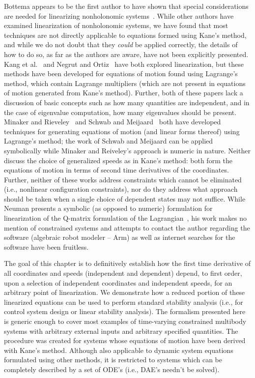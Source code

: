 Bottema appears to be the first author to have shown that special
considerations are needed for linearizing nonholonomic
systems~\cite{Bottema1949}. While other authors have examined linearization of
nonholonomic systems, we have found that most techniques are not directly
applicable to equations formed using Kane's method, and while we do not doubt
that they \textit{could} be applied correctly, the details of how to do so, as
far as the authors are aware, have not been explicitly presented. Kang et
al.~\cite{Kang2003} and Negrut and Ortiz~\cite{Negrut2006} have both explored
linearization, but these methods have been developed for equations of motion
found using Lagrange's method, which contain Lagrange multipliers (which are
not present in equations of motion generated from Kane's method). Further, both
of these papers lack a discussion of basic concepts such as how many quantities
are independent, and in the case of eigenvalue computation, how many
eigenvalues should be present. Minaker and Rieveley~\cite{Minaker2010} and
Schwab and Meijaard~\cite{Schwab2003} both have developed techniques for
generating equations of motion (and linear forms thereof) using Lagrange's
method; the work of Schwab and Meijaard can be applied symbolically while
Minaker and Reiveley's approach is numeric in nature. Neither discuss the
choice of generalized speeds as in Kane's method: both form the equations of
motion in terms of second time derivatives of the coordinates.  Further,
neither of these works address constraints which cannot be eliminated (i.e.,
nonlinear configuration constraints), nor do they address what approach should
be taken when a single choice of dependent states may not suffice. While Neuman
presents a symbolic (as opposed to numeric) formulation for linearization of
the Q-matrix formulation of the Lagrangian~\cite{Neuman1984}, his work makes no
mention of constrained systems and attempts to contact the author regarding the
software (algebraic robot modeler -- Arm) as well as internet searches for the
software have been fruitless.

The goal of this chapter is to definitively establish how the first time
derivative of all coordinates and speeds (independent and dependent)
depend, to first order, upon a selection of independent coordinates and
independent speeds, for an arbitrary point of linearization. We demonstrate how
a reduced portion of these linearized equations can be used to perform standard
stability analysis (i.e., for control system design or linear stability
analysis). The formalism presented here is generic enough to cover most
examples of time-varying constrained multibody systems with arbitrary external
inputs and arbitrary specified quantities.  The procedure was created for
systems whose equations of motion have been derived with Kane's method.
Although also applicable to dynamic system equations formulated using other
methods, it is restricted to systems which can be completely described by a set
of ODE's (i.e., DAE's needn't be solved).

